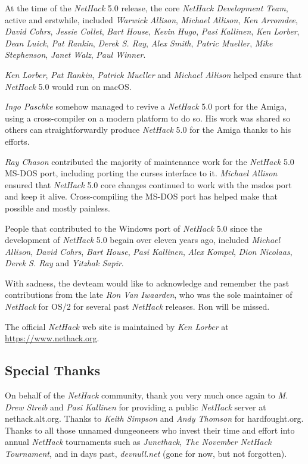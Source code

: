 \documentclass[titlepage]{article}
\begin{document}
\medskip
At the time of the \textit{NetHack} 5.0 release, the core
\textit{NetHack Development Team},
active and erstwhile, included \textit{Warwick Allison}, \textit{Michael Allison},
\textit{Ken Arromdee}, \textit{David Cohrs}, \textit{Jessie Collet}, \textit{Bart House},
\textit{Kevin Hugo}, \textit{Pasi Kallinen}, \textit{Ken Lorber}, \textit{Dean Luick},
\textit{Pat Rankin}, \textit{Derek S. Ray}, \textit{Alex Smith}, \textit{Patric Mueller},
\textit{Mike Stephenson}, \textit{Janet Walz}, \textit{Paul Winner}.

\medskip
\textit{Ken Lorber}, \textit{Pat Rankin}, \textit{Patrick Mueller} and
\textit{Michael Allison} helped ensure that \textit{NetHack} 5.0 would run
on macOS.

\medskip
\textit{Ingo Paschke} somehow managed to revive a \textit{NetHack} 5.0 port for the Amiga,
using a cross-compiler on a modern platform to do so. His work was shared so
others can straightforwardly produce \textit{NetHack} 5.0 for the Amiga thanks to his
efforts.

\medskip
\textit{Ray Chason} contributed the majority of maintenance work for the
\textit{NetHack} 5.0 MS-DOS port, including porting the curses interface to it.
\textit{Michael Allison} ensured that \textit{NetHack} 5.0 core changes continued to
work with the msdos port and keep it alive.  Cross-compiling the MS-DOS
port has helped make that possible and mostly painless.

\medskip
People that contributed to the Windows port of \textit{NetHack} 5.0 since the
development of \textit{NetHack} 5.0 begain over eleven years ago, included
\textit{Michael Allison}, \textit{David Cohrs}, \textit{Bart House},
\textit{Pasi Kallinen}, \textit{Alex Kompel}, \textit{Dion Nicolaas},
\textit{Derek S. Ray} and \textit{Yitzhak Sapir}.

\medskip
With sadness, the devteam would like to acknowledge and remember the past
contributions from the late \textit{Ron Van Iwaarden}, who was the sole maintainer
of \textit{NetHack} for OS/2 for several past \textit{NetHack} releases. Ron will be missed.

\medskip
\noindent The official \textit{NetHack} web site is maintained by \textit{Ken Lorber} at
\url{https://www.nethack.org}.


\subsection*{Special Thanks}
\noindent On behalf of the \textit{NetHack} community, thank you very much once
again to \textit{M. Drew Streib} and \textit{Pasi Kallinen} for providing a
public \textit{NetHack} server at nethack.alt.org. Thanks to \textit{Keith Simpson}
and \textit{Andy Thomson} for hardfought.org. Thanks to all those
unnamed dungeoneers who invest their time and effort into annual
\textit{NetHack} tournaments such as \textit{Junethack},
\textit{The November NetHack Tournament}, and in days past,
\textit{devnull.net} (gone for now, but not forgotten).
\clearpage
\end{document}
